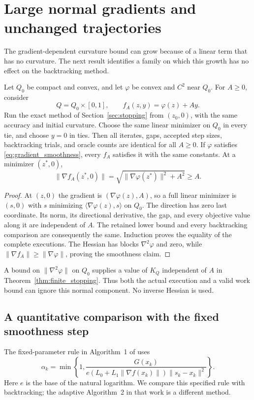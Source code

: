 \section{Large normal gradients and unchanged trajectories}
\label{sec:normal}
The gradient-dependent curvature bound can grow because of a linear
term that has no curvature. The next result identifies a family on
which this growth has no effect on the backtracking method.

\begin{proposition}
\label{prop:normal_invariance}
Let $Q_0$ be compact and convex, and let $\varphi$ be convex and $C^2$
near $Q_0$. For $A\ge0$, consider
\[
 Q=Q_0\times[0,1],\qquad f_A(z,y)=\varphi(z)+Ay.
\]
Run the exact method of Section~\ref{sec:stopping} from $(z_0,0)$,
with the same accuracy and initial curvature. Choose the same
linear minimizer on $Q_0$ in every tie, and choose $y=0$ in ties.
Then all iterates, gaps, accepted step sizes, backtracking trials, and
oracle counts are identical for all $A\ge0$. If $\varphi$ satisfies
\eqref{eq:gradient_smoothness}, every $f_A$ satisfies it with the same
constants. At a minimizer $(z^*,0)$,
\[
 \|\nabla f_A(z^*,0)\|
   =\sqrt{\|\nabla\varphi(z^*)\|^2+A^2}\ge A.
\]
\end{proposition}
\begin{proof}
At $(z,0)$ the gradient is $(\nabla\varphi(z),A)$, so a full linear
minimizer is $(s,0)$ with $s$ minimizing
$\langle\nabla\varphi(z),s\rangle$ on $Q_0$. The direction has zero
last coordinate. Its norm, its directional derivative, the gap, and
every objective value along it are independent of $A$. The retained
lower bound and every backtracking comparison are consequently the
same. Induction proves the equality of the complete executions.
The Hessian has blocks $\nabla^2\varphi$ and zero, while
$\|\nabla f_A\|\ge\|\nabla\varphi\|$, proving the smoothness claim.
\end{proof}

A bound on $\|\nabla^2\varphi\|$ on $Q_0$ supplies a value of $K_Q$
independent of $A$ in Theorem~\ref{thm:finite_stopping}. Thus both the
actual execution and a valid work bound can ignore this normal
component. No inverse Hessian is used.

\subsection{A quantitative comparison with the fixed smoothness step}
The fixed-parameter rule in Algorithm~1 of \cite{vyguzov} uses
\begin{equation}\label{eq:vyguzov_step}
 \alpha_k=\min\left\{1,
 \frac{G(x_k)}{e(L_0+L_1\|\nabla f(x_k)\|)\|s_k-x_k\|^2}
 \right\}.
\end{equation}
Here $e$ is the base of the natural logarithm. We compare this specified
rule with backtracking; the adaptive Algorithm~2 in that work is a
different method.

